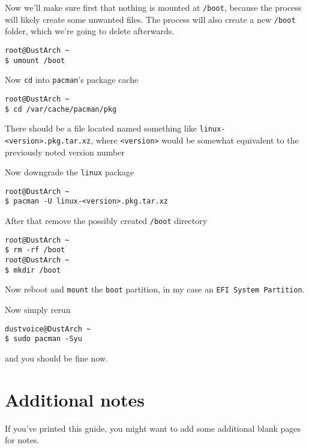 \documentclass[9pt]{report}
\begin{document}
Now we’ll make sure first that nothing is mounted at \texttt{/boot}, because the process will likely create some unwanted files.
The process will also create a new \texttt{/boot} folder, which we’re going to delete afterwards.


\begin{verbatim}
root@DustArch ~
$ umount /boot
\end{verbatim}

Now \texttt{cd} into \texttt{pacman}'s package cache


\begin{verbatim}
root@DustArch ~
$ cd /var/cache/pacman/pkg
\end{verbatim}

There should be a file located named something like \texttt{linux-<version>.pkg.tar.xz}, where \texttt{<version>} would be somewhat equivalent to the previously noted version number


Now downgrade the \texttt{linux} package


\begin{verbatim}
root@DustArch ~
$ pacman -U linux-<version>.pkg.tar.xz
\end{verbatim}

After that remove the possibly created \texttt{/boot} directory


\begin{verbatim}
root@DustArch ~
$ rm -rf /boot
root@DustArch ~
$ mkdir /boot
\end{verbatim}

Now reboot and \texttt{mount} the \texttt{boot} partition, in my case an \texttt{EFI System Partition}.


Now simply rerun


\begin{verbatim}
dustvoice@DustArch ~
$ sudo pacman -Syu
\end{verbatim}

and you should be fine now.


\hypertarget{x-additional-notes}{\chapter{Additional notes}}
If you’ve printed this guide, you might want to add some additional blank pages for notes.
\end{document}
